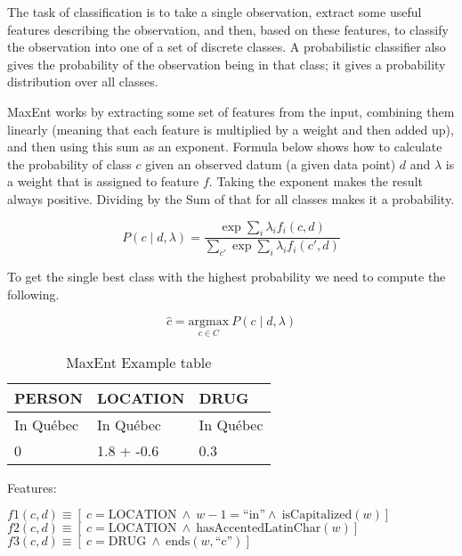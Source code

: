 The task of classification is to take a single observation, extract some useful features describing the observation, and then, based on these features, to classify the observation into one of a set of discrete classes. A probabilistic classifier also gives the probability of the observation being in that class; it gives a probability distribution over all classes.

MaxEnt works by extracting some set of features from the input, combining them linearly (meaning that each feature is multiplied by a weight and then added up), and then using this sum as an exponent.
Formula below shows how to calculate the probability of class $c$ given an observed datum (a given data point) $d$ and $\lambda$ is a weight that is assigned to feature $f$. Taking the exponent makes the result always positive. Dividing by the Sum of that for all classes makes it a probability.

\begin{equation}
  P(c \mid d, \lambda) = \frac{\exp\sum_i\lambda_i f_i (c,d)}
  {\sum_{c\prime}\exp\sum_{i}\lambda_i f_i (c\prime,d)}
  \label{eq:pcdlambda}
\end{equation}

To get the single best class with the highest probability we need to compute the following.

\begin{equation}
  \hat{c} = \underset{c\in C}{\text{argmax}} \ P(c \mid d,\lambda)
  \label{eq:hatc}
\end{equation}

\begin{table}[!htbp]
\caption[MaxEnt Example table]{MaxEnt Example table}
\label{tab:maxent}
  \centering
  \begin{tabu}{lll}
  \toprule
  PERSON    & LOCATION   & DRUG      \\ \midrule
  In Québec & In Québec  & In Québec \\
  0         & 1.8 + -0.6 & 0.3       \\
  \bottomrule
  \end{tabu}
\end{table}

Features:

$f1(c,d) \equiv [ \ c = \text{LOCATION} \ \wedge \ w-1 = \text{``in''} \wedge \ \text{isCapitalized}(w)]$\\
$f2(c,d) \equiv [ \ c = \text{LOCATION} \ \wedge \ \text{hasAccentedLatinChar}(w)]$\\
$f3(c,d) \equiv [ \ c = \text{DRUG} \ \wedge \ \text{ends}(w,\text{``c''})]$

